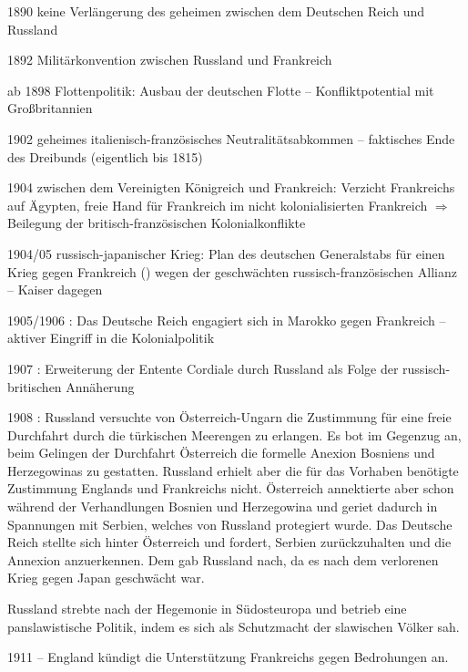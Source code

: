 \begin{chronik}
\item[1890] keine Verlängerung des geheimen
 zwischen dem
Deutschen Reich und Russland

\item[1892] Militärkonvention zwischen Russland und Frankreich

\item[ab 1898] Flottenpolitik: Ausbau der deutschen Flotte --
Konfliktpotential mit Großbritannien

\item[1902] geheimes italienisch-französisches Neutralitätsabkommen --
faktisches Ende des Dreibunds (eigentlich bis 1815)

\item[1904]  zwischen dem Vereinigten Königreich
und Frankreich: Verzicht Frankreichs auf Ägypten, freie Hand für
Frankreich im nicht kolonialisierten Frankreich $\Rightarrow$
Beilegung der britisch-französischen Kolonialkonflikte

\item[1904/05] russisch-japanischer Krieg:  Plan des deutschen
Generalstabs für einen Krieg gegen Frankreich ()
wegen der geschwächten russisch-französischen Allianz -- Kaiser
dagegen

\item[1905/1906] : Das Deutsche Reich engagiert
sich in Marokko gegen Frankreich -- aktiver Eingriff in die
Kolonialpolitik

\item[1907] : Erweiterung der Entente Cordiale
durch Russland als Folge der russisch-britischen Annäherung

\item[1908] : Russland versuchte von
Österreich-Ungarn die Zustimmung für eine freie Durchfahrt durch die
türkischen Meerengen zu erlangen.  Es bot im Gegenzug an, beim
Gelingen der Durchfahrt Österreich die formelle Anexion Bosniens und
Herzegowinas zu gestatten. Russland erhielt aber die für das Vorhaben
benötigte Zustimmung Englands und Frankreichs nicht. Österreich
annektierte aber schon während der Verhandlungen Bosnien und
Herzegowina und geriet dadurch in Spannungen mit Serbien, welches von
Russland protegiert wurde. Das Deutsche Reich stellte sich hinter
Österreich und fordert, Serbien zurückzuhalten und die Annexion
anzuerkennen. Dem gab Russland nach, da es nach dem verlorenen Krieg
gegen Japan geschwächt war.

Russland strebte nach der Hegemonie in Südosteuropa und betrieb eine
panslawistische Politik, indem es sich als Schutzmacht der slawischen
Völker sah.

\item[1911]  -- England kündigt die
Unterstützung Frankreichs gegen Bedrohungen an.
\end{chronik}
